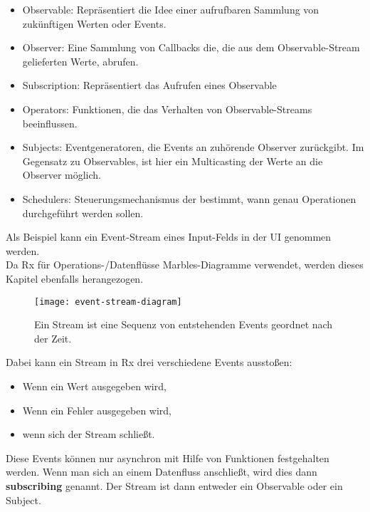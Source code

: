 \begin{itemize}
    \item Observable: Repräsentiert die Idee einer aufrufbaren Sammlung von zukünftigen Werten oder Events.
    \item Observer: Eine Sammlung von Callbacks die, die  aus dem Observable-Stream gelieferten Werte, abrufen.
    \item Subscription: Repräsentiert das Aufrufen eines Observable
    \item Operators: Funktionen, die das Verhalten von Observable-Streams beeinflussen.
    \item Subjects: Eventgeneratoren, die Events an zuhörende Observer zurückgibt. Im Gegensatz zu Observables, ist hier ein Multicasting der Werte an die Observer möglich.
    \item Schedulers: Steuerungsmechanismus der bestimmt, wann genau Operationen durchgeführt werden sollen.
\end{itemize}










Als Beispiel kann ein Event-Stream eines Input-Felds in der UI genommen werden.\\

\noindent
Da Rx für Operations-/Datenflüsse Marbles-Diagramme verwendet, werden dieses Kapitel ebenfalls herangezogen.

\begin{figure}[H]
\centering
\texttt{[image: event-stream-diagram]}
\caption{Ein Stream ist eine Sequenz von entstehenden Events geordnet nach der Zeit.}
\end{figure}

\noindent
Dabei kann ein Stream in Rx drei verschiedene Events ausstoßen:

\begin{itemize}
\item Wenn ein Wert ausgegeben wird,
\item Wenn ein Fehler ausgegeben wird,
\item wenn sich der Stream schließt.
\end{itemize}

\noindent
Diese Events können nur asynchron mit Hilfe von Funktionen festgehalten werden. Wenn man sich an einem Datenfluss anschließt, wird dies dann \textbf{subscribing} genannt. Der Stream ist dann entweder ein Observable oder ein Subject. 

